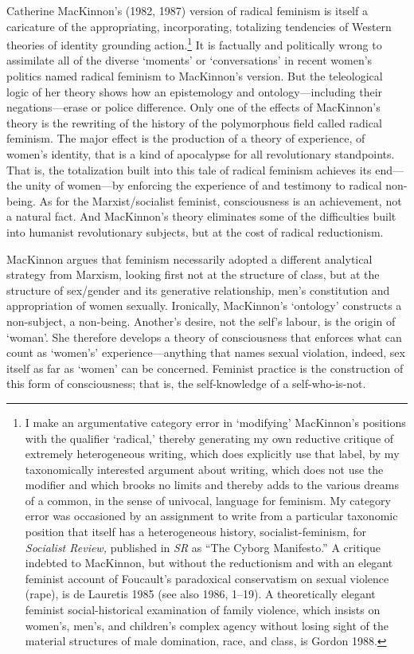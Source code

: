 \documentclass[DIV=12,%
               BCOR=10mm,%
               headinclude=false,%
               footinclude=false,open=any,%
               fontsize=11pt,%
               twoside,%
               paper=210mm:11in]%
               {scrbook}
\newcommand*{\Slash}{\slash\hspace{0pt}}
\begin{document}
Catherine MacKinnon’s (1982, 1987) version of radical feminism is itself a caricature of the appropriating, incorporating, totalizing tendencies of Western theories of identity grounding action.\footnote{I make an argumentative category error in ‘modifying’ MacKinnon’s positions with the qualifier ‘radical,’ thereby generating my own reductive critique of extremely heterogeneous writing, which does explicitly use that label, by my taxonomically interested argument about writing, which does not use the modifier and which brooks no limits and thereby adds to the various dreams of a common, in the sense of univocal, language for feminism. My category error was occasioned by an assignment to write from a particular taxonomic position that itself has a heterogeneous history, socialist-feminism, for \emph{Socialist Review,} published in \emph{SR} as “The Cyborg Manifesto.” A critique indebted to MacKinnon, but without the reductionism and with an elegant feminist account of Foucault’s paradoxical conservatism on sexual violence (rape), is de Lauretis 1985 (see also 1986, 1–19). A theoretically elegant feminist social-historical examination of family violence, which insists on women’s, men’s, and children’s complex agency without losing sight of the material structures of male domination, race, and class, is Gordon 1988.} It is factually and politically wrong to assimilate all of the diverse ‘moments’ or ‘conversations’ in recent women’s politics named radical feminism to MacKinnon’s version. But the teleological logic of her theory shows how an epistemology and ontology—including their negations—erase or police difference. Only one of the effects of MacKinnon’s theory is the rewriting of the history of the polymorphous field called radical feminism. The major effect is the production of a theory of experience, of women’s identity, that is a kind of apocalypse for all revolutionary standpoints. That is, the totalization built into this tale of radical feminism achieves its end—the unity of women—by enforcing the experience of and testimony to radical non-being. As for the Marxist\Slash{}socialist feminist, consciousness is an achievement, not a natural fact. And MacKinnon’s theory eliminates some of the difficulties built into humanist revolutionary subjects, but at the cost of radical reductionism.


MacKinnon argues that feminism necessarily adopted a different analytical strategy from Marxism, looking first not at the structure of class, but at the structure of sex\Slash{}gender and its generative relationship, men’s constitution and appropriation of women sexually. Ironically, MacKinnon’s ‘ontology’ constructs a non-subject, a non-being. Another’s desire, not the self’s labour, is the origin of ‘woman’. She therefore develops a theory of consciousness that enforces what can count as ‘women’s’ experience—anything that names sexual violation, indeed, sex itself as far as ‘women’ can be concerned. Feminist practice is the construction of this form of consciousness; that is, the self-knowledge of a self-who-is-not.
\end{document}
